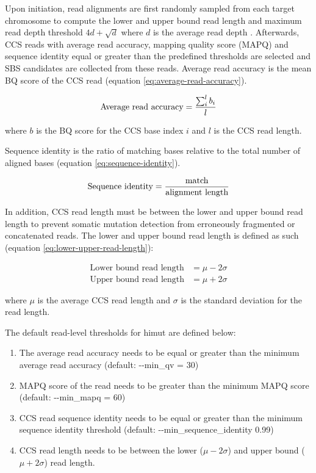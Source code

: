 Upon initiation, read alignments are first randomly sampled from each target chromosome to compute the lower and upper bound read length and maximum read depth threshold $4d + \sqrt{d}$ where $d$ is the average read depth \cite{Li2014-ra}. Afterwards, CCS reads with average read accuracy, mapping quality score (MAPQ) and sequence identity equal or greater than the predefined thresholds are selected and SBS candidates are collected from these reads. Average read accuracy is the mean BQ score of the CCS read (equation \ref{eq:average-read-accuracy}).

\begin{equation} \label{eq:average-read-accuracy}
\text{Average read accuracy} = \frac{\sum^{l}_{i}b_{i}}{l} \smallskip
\end{equation}

where $b$ is the BQ score for the CCS base index $i$ and $l$ is the CCS read length.

Sequence identity is the ratio of matching bases relative to the total number of aligned bases (equation \ref{eq:sequence-identity}).  

\begin{equation} \label{eq:sequence-identity}
\text{Sequence identity} = \frac{\text{match}}{\text{alignment length}} \smallskip
\end{equation}

In addition, CCS read length must be between the lower and upper bound read length to prevent somatic mutation detection from erroneously fragmented or concatenated reads. The lower and upper bound read length is defined as such (equation \ref{eq:lower-upper-read-length}): 

\begin{equation}
\begin{aligned} 
\text{Lower bound read length} &= \mu - 2\sigma \\
\text{Upper bound read length} &= \mu + 2\sigma 
\end{aligned}
\label{eq:lower-upper-read-length}
\end{equation}

where $\mu$ is the average CCS read length and $\sigma$ is the standard deviation for the read length. 

The default read-level thresholds for himut are defined below:

\begin{enumerate}
\item The average read accuracy needs to be equal or greater than the minimum average read accuracy (default: -{}-min\_qv = 30)
\item MAPQ score of the read needs to be greater than the minimum MAPQ score (default: -{}-min\_mapq = 60)
\item CCS read sequence identity needs to be equal or greater than the minimum sequence identity threshold (default: -{}-min\_sequence\_identity 0.99)
\item CCS read length needs to be between the lower ($\mu - 2\sigma$) and upper bound ($\mu + 2\sigma$) read length.
\end{enumerate}

